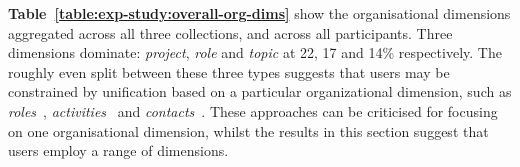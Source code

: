 \textbf{Table~\ref{table:exp-study:overall-org-dims}} show the organisational dimensions aggregated across all three collections, and across all participants. Three dimensions dominate: \textit{project}, \textit{role} and \textit{topic} at 22, 17 and 14\% respectively. The roughly even split between these three types suggests that users may be constrained by unification based on a particular organizational dimension, such as \textit{roles}~\citep{Shneiderman:94}, \textit{activities}~\citep{Kaptelinin:03} and \textit{contacts}~\citep{Whittaker-contactmap:02b}.  These approaches can be criticised for focusing on one organisational dimension, whilst the results in this section suggest that users employ a range of dimensions. %
